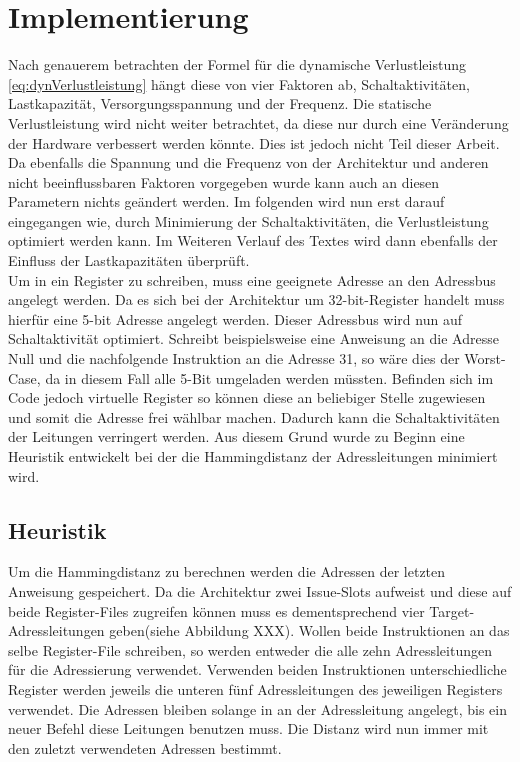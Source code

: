 \chapter{Implementierung}
\label{chap:Implementierung}

Nach genauerem betrachten der Formel für die dynamische Verlustleistung \ref{eq:dynVerlustleistung} hängt diese von vier Faktoren ab, Schaltaktivitäten,  Lastkapazität, Versorgungsspannung und der Frequenz. Die statische Verlustleistung wird nicht weiter betrachtet, da diese nur durch eine Veränderung der Hardware verbessert werden könnte. Dies ist jedoch nicht Teil dieser Arbeit. Da ebenfalls die Spannung und die Frequenz von der Architektur und anderen nicht beeinflussbaren Faktoren vorgegeben wurde kann auch an diesen Parametern nichts geändert werden. Im folgenden wird nun erst darauf eingegangen wie, durch Minimierung der Schaltaktivitäten, die Verlustleistung optimiert werden kann. Im Weiteren Verlauf des Textes wird dann ebenfalls der Einfluss der Lastkapazitäten überprüft.\\
Um in ein Register zu schreiben, muss eine geeignete Adresse an den Adressbus angelegt werden. Da es sich bei der Architektur um 32-bit-Register handelt muss hierfür eine 5-bit Adresse angelegt werden. Dieser Adressbus wird nun auf Schaltaktivität optimiert. Schreibt beispielsweise eine Anweisung an die Adresse Null und die nachfolgende Instruktion an die Adresse 31, so wäre dies der Worst-Case, da in diesem Fall alle 5-Bit umgeladen werden müssten. Befinden sich im Code jedoch virtuelle Register so können diese an beliebiger Stelle zugewiesen und somit die Adresse frei wählbar machen. Dadurch kann die Schaltaktivitäten der Leitungen verringert werden. Aus diesem Grund wurde zu Beginn eine Heuristik entwickelt bei der die Hammingdistanz der Adressleitungen minimiert wird.
\section{Heuristik}
\label{sec:Heuristik}
Um die Hammingdistanz zu berechnen werden die Adressen der letzten Anweisung gespeichert. Da die Architektur zwei Issue-Slots aufweist und diese auf beide Register-Files zugreifen können muss es dementsprechend vier Target-Adressleitungen geben(siehe Abbildung XXX). Wollen beide Instruktionen an das selbe Register-File schreiben, so werden entweder die alle zehn Adressleitungen für die Adressierung verwendet. Verwenden beiden Instruktionen unterschiedliche Register werden jeweils die unteren fünf Adressleitungen des jeweiligen Registers verwendet. Die Adressen bleiben solange in an der Adressleitung angelegt, bis ein neuer Befehl diese Leitungen benutzen muss. Die Distanz wird nun immer mit den zuletzt verwendeten Adressen bestimmt. 

